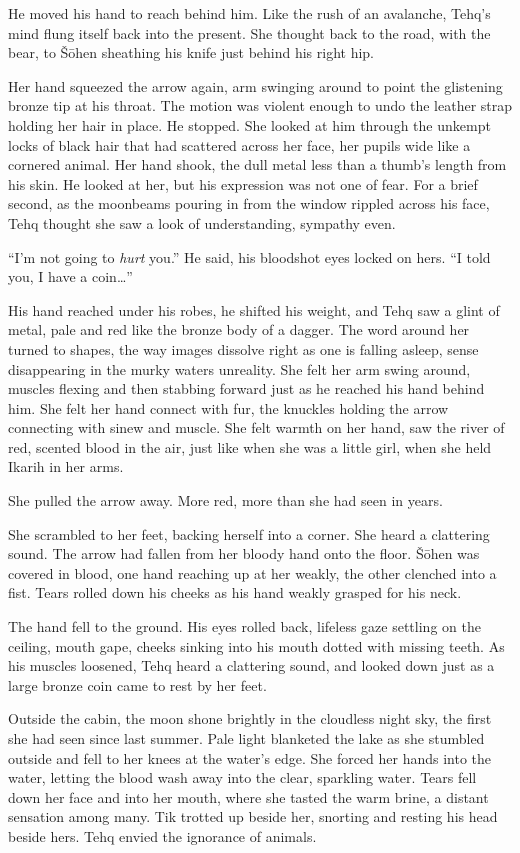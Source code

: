 He moved his hand to reach behind him. Like the rush of an avalanche, Tehq's mind flung itself back into the present. She thought back to the road, with the bear, to Šōhen sheathing his knife just behind his right hip.

Her hand squeezed the arrow again, arm swinging around to point the glistening bronze tip at his throat. The motion was violent enough to undo the leather strap holding her hair in place. He stopped. She looked at him through the unkempt locks of black hair that had scattered across her face, her pupils wide like a cornered animal. Her hand shook, the dull metal less than a thumb's length from his skin. He looked at her, but his expression was not one of fear. For a brief second, as the moonbeams pouring in from the window rippled across his face, Tehq thought she saw a look of understanding, sympathy even.

``I'm not going to \emph{hurt} you.'' He said, his bloodshot eyes locked on hers. ``I told you, I have a coin\ldots''

His hand reached under his robes, he shifted his weight, and Tehq saw a glint of metal, pale and red like the bronze body of a dagger. The word around her turned to shapes, the way images dissolve right as one is falling asleep, sense disappearing in the murky waters unreality. She felt her arm swing around, muscles flexing and then stabbing forward just as he reached his hand behind him. She felt her hand connect with fur, the knuckles holding the arrow connecting with sinew and muscle. She felt warmth on her hand, saw the river of red, scented blood in the air, just like when she was a little girl, when she held Ikarih in her arms.

She pulled the arrow away. More red, more than she had seen in years.

She scrambled to her feet, backing herself into a corner. She heard a clattering sound. The arrow had fallen from her bloody hand onto the floor. Šōhen was covered in blood, one hand reaching up at her weakly, the other clenched into a fist. Tears rolled down his cheeks as his hand weakly grasped for his neck.

The hand fell to the ground. His eyes rolled back, lifeless gaze settling on the ceiling, mouth gape, cheeks sinking into his mouth dotted with missing teeth. As his muscles loosened, Tehq heard a clattering sound, and looked down just as a large bronze coin came to rest by her feet.

Outside the cabin, the moon shone brightly in the cloudless night sky, the first she had seen since last summer. Pale light blanketed the lake as she stumbled outside and fell to her knees at the water's edge. She forced her hands into the water, letting the blood wash away into the clear, sparkling water. Tears fell down her face and into her mouth, where she tasted the warm brine, a distant sensation among many. Tik trotted up beside her, snorting and resting his head beside hers. Tehq envied the ignorance of animals.

